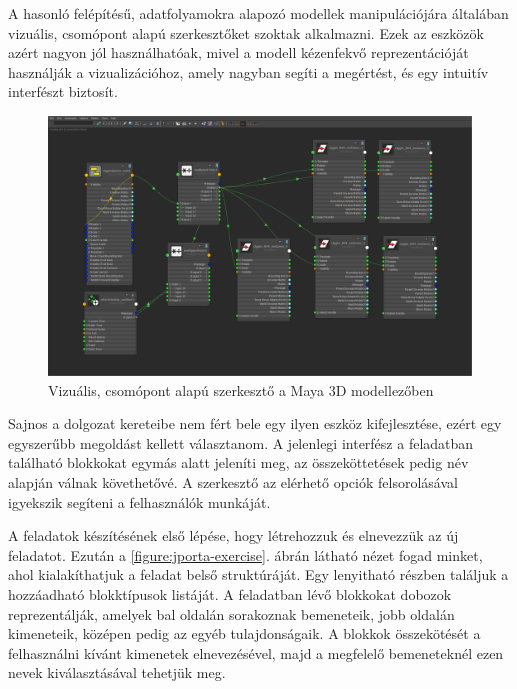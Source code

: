 A hasonló felépítésű, adatfolyamokra alapozó modellek manipulációjára általában vizuális, csomópont alapú szerkesztőket szoktak alkalmazni.
Ezek az eszközök azért nagyon jól használhatóak, mivel a modell kézenfekvő reprezentációját használják a vizualizációhoz, amely nagyban segíti a megértést, és egy intuitív interfészt biztosít.
\begin{figure}[h]
    \centering
    \includegraphics[width=\textwidth]{figures/node-based-editor}
    \caption{Vizuális, csomópont alapú szerkesztő a Maya 3D modellezőben}
    \label{figure:node-based-editor}
\end{figure}

Sajnos a dolgozat kereteibe nem fért bele egy ilyen eszköz kifejlesztése, ezért egy egyszerűbb megoldást kellett választanom.
A jelenlegi interfész a feladatban található blokkokat egymás alatt jeleníti meg, az összeköttetések pedig név alapján válnak követhetővé.
A szerkesztő az elérhető opciók felsorolásával igyekszik segíteni a felhasználók munkáját.

A feladatok készítésének első lépése, hogy létrehozzuk és elnevezzük az új feladatot.
Ezután a \ref{figure:jporta-exercise}. ábrán látható nézet fogad minket, ahol kialakíthatjuk a feladat belső struktúráját.
Egy lenyitható részben találjuk a hozzáadható blokktípusok listáját.
A feladatban lévő blokkokat dobozok reprezentálják, amelyek bal oldalán sorakoznak bemeneteik, jobb oldalán kimeneteik, középen pedig az egyéb tulajdonságaik.
A blokkok összekötését a felhasználni kívánt kimenetek elnevezésével, majd a megfelelő bemeneteknél ezen nevek kiválasztásával tehetjük meg.

